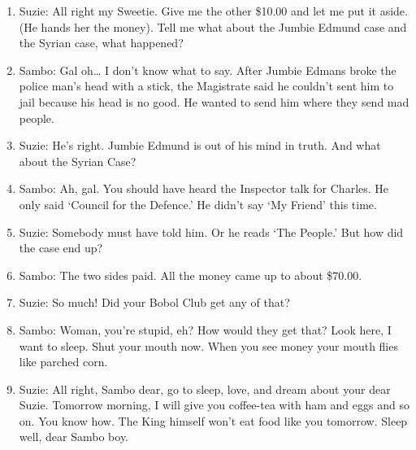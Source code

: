 \documentclass[output=paper,colorlinks,citecolor=brown]{langscibook}
\begin{document}
\begin{enumerate}[nosep]
    \item  Suzie:	All right my Sweetie. Give me the other \$10.00 and let me put it aside. (He hands her the money). Tell me what about the Jumbie Edmund case and the Syrian case, what happened?
    \item  Sambo:  Gal oh… I don’t know what to say. After Jumbie Edmans broke the police man’s head with a stick, the Magistrate said he couldn’t sent him to jail because his head is no good.  He wanted to send him where they send mad people.
    \item  Suzie:	He’s right. Jumbie Edmund is out of his mind in truth. And what about the Syrian Case?
    \item  Sambo:  Ah, gal. You should have heard the Inspector talk for Charles. He only said ‘Council for the Defence.’ He didn’t say ‘My Friend’ this time.
    \item  Suzie:	Somebody must have told him.  Or he reads ‘The People.’ But how did the case end up?
    \item  Sambo:  The two sides paid. All the money came up to about \$70.00.
    \item  Suzie:	So much! Did your Bobol Club get any of that?
    \item  Sambo:  Woman, you’re stupid, eh? How would they get that? Look here, I want to sleep. Shut your mouth now. When you see money your mouth flies like parched corn.
    \item  Suzie:	All right, Sambo dear, go to sleep, love, and dream about your dear Suzie.  Tomorrow morning, I will give you coffee-tea with ham and eggs and so on.  You know  how.  The King himself won’t eat food like you tomorrow.  Sleep well, dear Sambo boy.
\end{enumerate}
\end{document}
